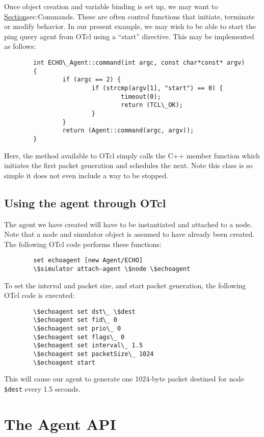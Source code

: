 Once object creation and variable binding is set up, we may
want to \href{create methods implemented in C++ but which can
be invoked from OTcl}{Section}{sec:Commands}.
These are often control functions that initiate, terminate or
modify behavior.
In our present example, we may wish to be able to start the
ping query agent from OTcl using a ``start'' directive.
This may be implemented as follows:
\begin{verbatim}
        int ECHO\_Agent::command(int argc, const char*const* argv)
        {
                if (argc == 2) {
                        if (strcmp(argv[1], "start") == 0) {
                                timeout(0);
                                return (TCL\_OK);
                        }
                }
                return (Agent::command(argc, argv));
        }
\end{verbatim}
Here, the  method available to OTcl simply calls
the C++ member function  which initiates the
first packet generation and schedules the next.
Note this class is so simple it does not even include a
way to be stopped.

\subsection{Using the agent through OTcl}
\label{sec:agents:exotclcode}

The agent we have created will have to be instantiated and attached
to a node.
Note that a node and simulator object is assumed to have
already been created.
The following OTcl code performs these functions:
\begin{verbatim}
        set echoagent [new Agent/ECHO]
        \$simulator attach-agent \$node \$echoagent
\end{verbatim}
To set the interval and packet size, and start packet generation,
the following OTcl code is executed:
\begin{verbatim}
        \$echoagent set dst\_ \$dest
        \$echoagent set fid\_ 0
        \$echoagent set prio\_ 0
        \$echoagent set flags\_ 0
        \$echoagent set interval\_ 1.5
        \$echoagent set packetSize\_ 1024
        \$echoagent start
\end{verbatim}
This will cause our agent to generate one 1024-byte packet destined for
node {\tt \$dest} every 1.5 seconds.

\section{The Agent API}
\label{sec:agents:api}

